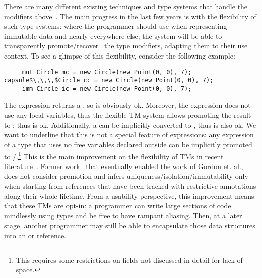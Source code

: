 \noindent There are many different existing techniques and type systems that handle the modifiers above~\cite{ZibinEtAl10,ClarkeWrigstad03,HallerOdersky10,GordonEtAl12,ServettoZucca15}.
The main progress in the last few years is with the flexibility of such type systems:
 where the programmer should use \Q@imm@ when  representing immutable data
and \Q@mut@ nearly everywhere else; the system will be able to transparently promote/recover~\cite{GordonEtAl12,clebsch2015deny,ServettoZucca15} the type modifiers, adapting them to their use context.
To see a glimpse of this flexibility, consider the following example:
\saveSpace
\begin{lstlisting}
     mut Circle mc = new Circle(new Point(0, 0), 7);
capsule$\,\,\,$Circle cc = new Circle(new Point(0, 0), 7);
     imm Circle ic = new Circle(new Point(0, 0), 7);
\end{lstlisting}
\saveSpace
{}
The \Q@new@ expression returns a \Q@mut@, so \Q@mc@ is obviously ok.
Moreover, the expression does not use any \Q@mut@ local variables, thus the flexible TM system
allows promoting the \Q@mut@ result to \Q@capsule@; thus \Q@cc@ is ok. 
Additionally, a \Q@capsule@ can be implicitly converted to \Q@imm@, thus \Q@ic@ is also ok.
We want to underline that this is not a special feature of \Q@new@ expressions:
any expression of a \Q@mut@ type that uses no free \Q@mut@ variables declared outside can be implicitly promoted to \Q@capsule@/\Q@imm@.\footnote{
This requires some restrictions on \Q@read@ fields not discussed in detail for lack of space.
} This is the main improvement on the flexibility of TMs in recent literature~\cite{ServettoEtAl13a,ServettoZucca15,GordonEtAl12,clebsch2015deny,clebsch2017orca}.
Former work~\cite{Boyland10,boyland2003checking,Hogg91,Smith:2000:AT:645394.651903,DBLP:conf/pldi/AikenFKT03} that eventually enabled the work of Gordon et. al., does not consider promotion and 
infers uniqueness/isolation/immutability only when starting from references that have been tracked with restrictive annotations along their whole lifetime.
From a usability perspective, this improvement means that
these TMs are opt-in: a programmer can write large sections of code
mindlessly using \Q@mut@ types and be free to have rampant aliasing. 
Then, at a later stage, another programmer may still 
be able to encapsulate those data structures into an \Q@imm@ or \Q@capsule@ reference.

